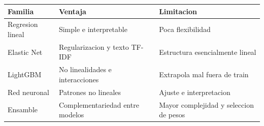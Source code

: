 
\begin{tabular}{lll}
\toprule
Familia & Ventaja & Limitacion\\
\midrule
Regresion lineal & Simple e interpretable & Poca flexibilidad\\
Elastic Net & Regularizacion y texto TF-IDF & Estructura esencialmente lineal\\
LightGBM & No linealidades e interacciones & Extrapola mal fuera de train\\
Red neuronal & Patrones no lineales & Ajuste e interpretacion\\
Ensamble & Complementariedad entre modelos & Mayor complejidad y seleccion de pesos\\
\bottomrule
\end{tabular}
